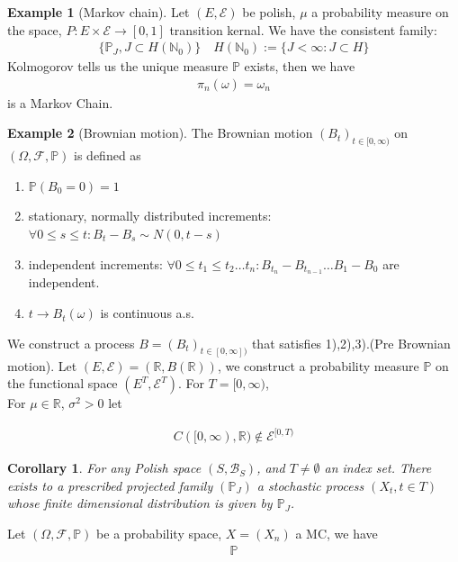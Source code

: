 \documentclass[a4paper,11pt]{book}
\newtheorem{corollary}{Corollary}[theorem]
\theoremstyle{definition}
\newtheorem*{example}{Example}
\theoremstyle{remark}
\begin{document}
\begin{example}[Markov chain]
Let $(E, \mathcal{E})$ be polish, $\mu$ a probability measure on the space, $P:E \times \mathcal{E} \rightarrow [0, 1]$ transition kernal. We have the consistent family:
\begin{align*}
	\{\mathbb{P}_J, J \subset  H(\mathbb{N}_0)\}
	 \quad H(\mathbb{N}_0):= \{J< \infty: J \subset H\}
\end{align*}	
Kolmogorov tells us the unique measure $\mathbb{P}$ exists, then we have
\begin{align*}
	\pi_n(\omega) = \omega_n
\end{align*}
is a Markov Chain.
\end{example}

\begin{example}[Brownian motion]
The Brownian motion $(B_t)_{t \in [0, \infty)}$ on $(\Omega, \mathcal{F}, \mathbb{P})$ is defined as 
	\begin{enumerate}
		\item $\mathbb{P}(B_0 = 0) = 1$
		\item stationary, normally distributed increments: $\forall 0 \le s \le t: B_t - B_s \sim N(0, t-s)$
		\item independent increments: $\forall 0 \le t_1 \le t_2 \dots t_n: B_{t_n} - B_{t_{n-1}} \dots B_1 - B_0$ are independent.
		\item $t \rightarrow B_t(\omega)$ is continuous a.s.
	\end{enumerate}
	We construct a process $B = (B_t)_{t\in [0, \infty])}$ that satisfies 1),2),3).(Pre Brownian motion). Let $(E, \mathcal{E}) = (\mathbb{R}, B(\mathbb{R}))$, we construct a probability measure $\mathbb{P}$ on the functional space $(E^T, \mathcal{E}^T)$. For $T = [0, \infty)$, 
	\\
	For $\mu \in \mathbb{R}$, $\sigma^2 > 0$ let 
	
	\begin{align*}
		C([0, \infty), \mathbb{R}) \notin \mathcal{E}^{[0, T)}
	\end{align*}
\end{example}

\begin{corollary}
	For any Polish space $(S, \mathcal{B}_S)$, and $T \neq \emptyset$ an index set. There exists to a prescribed projected family $(\mathbb{P}_J)$ a stochastic process $(X_t, t \in T)$ whose finite dimensional distribution is given by $\mathbb{P}_J$.
\end{corollary}
Let $(\Omega, \mathcal{F}, \mathbb{P})$ be a probability space, $X = (X_n)$ a MC, we have
\begin{align*}
	\mathbb{P}
\end{align*}
\end{document}
